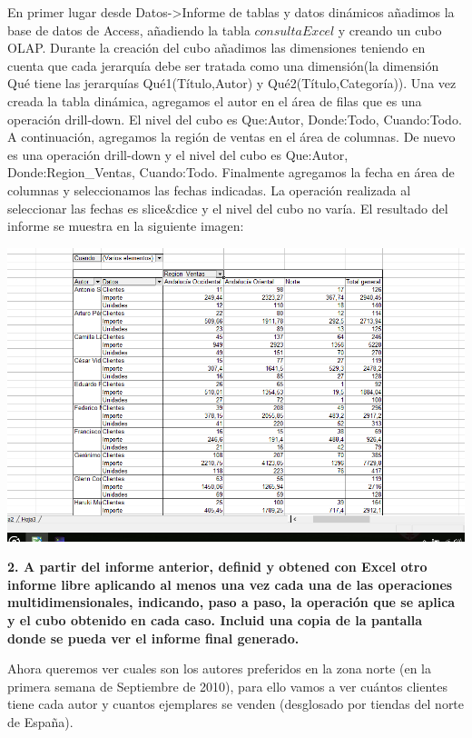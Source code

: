 \documentclass[paper=a4, fontsize=11pt, spanish]{scrartcl}
\numberwithin{equation}{section} %
\numberwithin{figure}{section} %
\numberwithin{table}{section} %
\begin{document}
En primer lugar desde Datos->Informe de tablas y datos dinámicos añadimos la base de datos de Access, añadiendo la tabla $consultaExcel$ y creando un cubo OLAP. Durante la creación del cubo añadimos las dimensiones teniendo en cuenta que cada jerarquía debe ser tratada como una dimensión(la dimensión Qué tiene las jerarquías Qué1(Título,Autor) y Qué2(Título,Categoría)). Una vez creada la tabla dinámica, agregamos el autor en el área de filas que es una operación drill-down. El nivel del cubo es Que:Autor, Donde:Todo, Cuando:Todo. A continuación, agregamos la región de ventas en el área de columnas. De nuevo es una operación drill-down y el nivel del cubo es Que:Autor, Donde:Region\_Ventas, Cuando:Todo. Finalmente agregamos la fecha en área de columnas y seleccionamos las fechas indicadas. La operación realizada al seleccionar las fechas es slice\&dice y el nivel del cubo no varía.
\newline
El resultado del informe se muestra en la siguiente imagen:
\begin{center}
	\includegraphics[scale=0.5]{img1.png}
\end{center}
\bigskip
\textbf{2. A partir del informe anterior, definid y obtened con Excel otro informe libre aplicando al menos una vez cada una de las operaciones multidimensionales, indicando, paso a paso, la operación que se aplica y el cubo obtenido en cada caso.
Incluid una copia de la pantalla donde se pueda ver el informe final generado.}\medskip

Ahora queremos ver cuales son los autores preferidos en la zona norte (en la primera semana de Septiembre de 2010), para ello vamos a ver cuántos clientes tiene cada autor y cuantos ejemplares se venden (desglosado por tiendas del norte de España).\\
\end{document}
